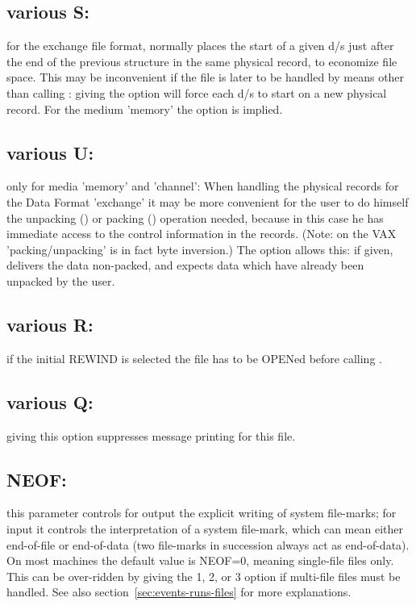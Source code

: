 \subsection*{various S:}

for the exchange file format,
 normally places the start of a given d/s just after
the end of the previous structure in the same physical record,
to economize file space.
This may be inconvenient if the file is later to be handled
by means other than calling : giving the  option
will force each d/s to start on a new physical record.
For the medium 'memory' the  option is implied.

\subsection*{various U:}

only for media 'memory' and 'channel':
When handling the physical records for the Data Format 'exchange'
it may be more convenient for the user to do himself the
unpacking () or packing () operation needed,
because in this case he has immediate access to the control
information in the records.
(Note: on the VAX 'packing/unpacking' is in fact byte inversion.)
The  option allows this:
if given,  delivers the data non-packed,
and  expects data which have already been unpacked by the user.

\subsection*{various R:}

if the initial REWIND is selected the file has to be OPENed
before calling .

\subsection*{various Q:}

giving this option suppresses message printing for this file.

\subsection*{NEOF:}

this parameter controls for output
the explicit writing of system file-marks;
for input it controls the interpretation of a system file-mark,
which can mean either end-of-file or end-of-data
(two file-marks in succession always act as end-of-data).
On most machines the default value is NEOF=0,
meaning single-file files only.
This can be over-ridden by giving the 1, 2, or 3 option
if multi-file files must be handled.
See also section~\ref{sec:events-runs-files} for more explanations.

